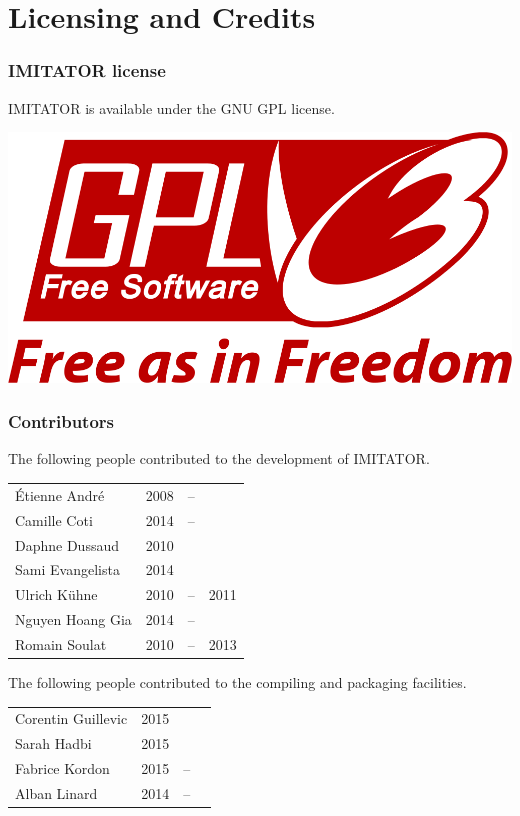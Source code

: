 \documentclass[a4paper,11pt]{report}
\newcommand{\imitator}{\textsf{IMITATOR}}
\begin{document}


\chapter{Licensing and Credits}

\subsection*{\imitator{} license}
\imitator{} is available under the GNU GPL license.

\begin{center}
	\includegraphics[width=.3\textwidth]{images/GPLv3_Logo.png}
\end{center}

\bigskip

\subsection*{Contributors}
The following people contributed to the development of \imitator{}.


\begin{tabular}{l l @{ } c @{ } l}
	Étienne André & 2008 & -- & \\
	Camille Coti & 2014 & -- & \\
	Daphne Dussaud & 2010 & & \\
	Sami Evangelista & 2014 & & \\
	Ulrich Kühne & 2010 & -- & 2011 \\
	Nguyen Hoang Gia & 2014 & -- & \\
	Romain Soulat & 2010 & -- & 2013 \\
\end{tabular}

\bigskip

The following people contributed to the compiling and packaging facilities.

\begin{tabular}{l l @{ } c @{ } l}
	Corentin Guillevic & 2015 & & \\
	Sarah Hadbi & 2015 & & \\
	Fabrice Kordon & 2015 & -- & \\
	Alban Linard & 2014 & -- \\
\end{tabular}
\end{document}
